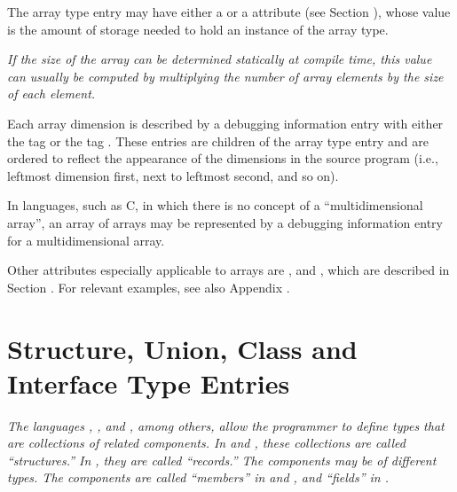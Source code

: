 The array type entry may have either a  or a
 attribute 
(see Section ), 
whose value is the
amount of storage needed to hold an instance of the array type.

\textit{If the size of the array can be determined statically at
compile time, this value can usually be computed by multiplying
the number of array elements by the size of each element.}


Each array dimension is described by a debugging information
entry with either the 
tag  or the 
tag
. These entries are
children of the
array type entry and are ordered to reflect the appearance of
the dimensions in the source program (i.e., leftmost dimension
first, next to leftmost second, and so on).

In languages, such as C, in which there is no concept of
a “multidimensional array”, an array of arrays may
be represented by a debugging information entry for a
multidimensional array.

Other attributes especially applicable to arrays are
, 
 and 
,
which are described in 
Section . 
For relevant examples,
see also 
Appendix .

\section{ Structure, Union, Class and Interface Type Entries}
\label{chap:structureunionclassandinterfacetypeentries}

\textit{The languages 
, 
, and 
, among others, allow the
programmer to define types that are collections of related
components. 
In  and , these collections are called
“structures.” 
In , they are called “records.”
The components may be of different types. The components are
called “members” in  and 
, and “fields” in .}

